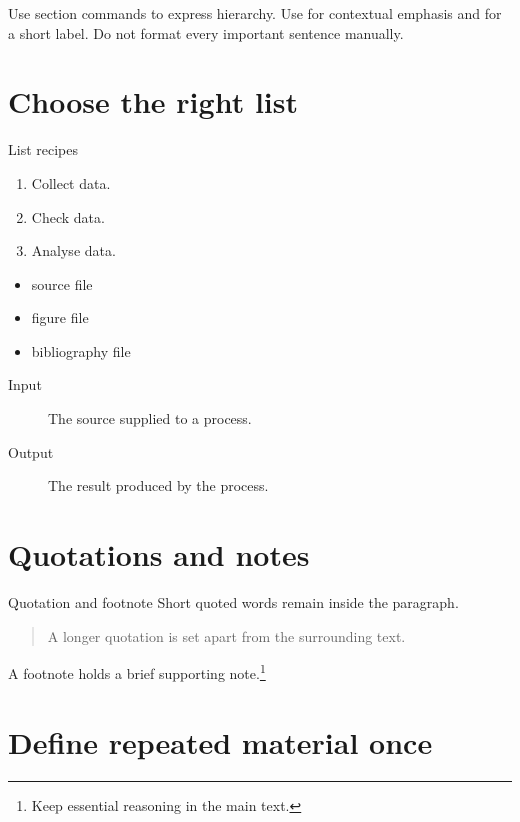 Use section commands to express hierarchy. Use  for contextual
emphasis and  for a short label. Do not format every important
sentence manually.

\section{Choose the right list}

\begin{latexcode}{List recipes}
\begin{enumerate}
  \item Collect data.
  \item Check data.
  \item Analyse data.
\end{enumerate}

\begin{itemize}
  \item source file
  \item figure file
  \item bibliography file
\end{itemize}

\begin{description}
  \item[Input] The source supplied to a process.
  \item[Output] The result produced by the process.
\end{description}
\end{latexcode}

\section{Quotations and notes}

\begin{latexcode}{Quotation and footnote}
Short quoted words remain inside the paragraph.

\begin{quote}
A longer quotation is set apart from the surrounding text.
\end{quote}

A footnote holds a brief supporting note.\footnote{Keep
essential reasoning in the main text.}
\end{latexcode}

\section{Define repeated material once}

